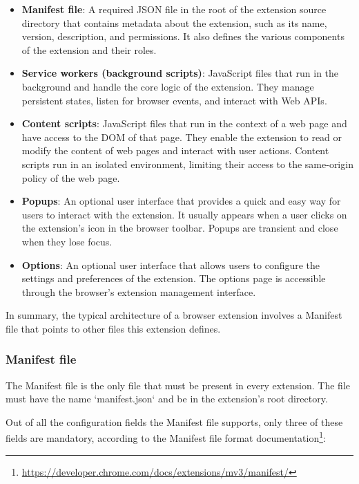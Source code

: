 \begin{itemize}
	\item \textbf{Manifest file}: A required JSON file in the root of the extension source directory that contains metadata about the extension, such as its name, version, description, and permissions. It also defines the various components of the extension and their roles.
	\item \textbf{Service workers (background scripts)}: JavaScript files that run in the background and handle the core logic of the extension. They manage persistent states, listen for browser events, and interact with Web APIs.
	\item \textbf{Content scripts}: JavaScript files that run in the context of a web page and have access to the DOM of that page. They enable the extension to read or modify the content of web pages and interact with user actions. Content scripts run in an isolated environment, limiting their access to the same-origin policy of the web page.
	\item \textbf{Popups}: An optional user interface that provides a quick and easy way for users to interact with the extension. It usually appears when a user clicks on the extension's icon in the browser toolbar. Popups are transient and close when they lose focus.
	\item \textbf{Options}: An optional user interface that allows users to configure the settings and preferences of the extension. The options page is accessible through the browser's extension management interface.
\end{itemize}

In summary, the typical architecture of a browser extension involves a Manifest file that points to other files this extension defines.

\subsubsection{Manifest file}

The Manifest file is the only file that must be present in every extension. The file must have the name `manifest.json` and be in the extension's root directory.

Out of all the configuration fields the Manifest file supports, only three of these fields are mandatory, according to the Manifest file format documentation\footnote{\url{https://developer.chrome.com/docs/extensions/mv3/manifest/}}:


